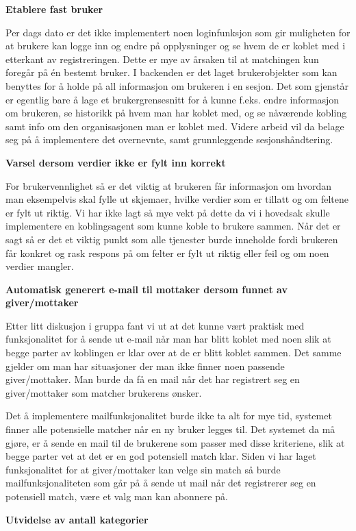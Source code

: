 {\bf Etablere fast bruker}

Per dags dato er det ikke implementert noen loginfunksjon som gir muligheten for at brukere kan logge inn og endre på opplysninger og se hvem de er koblet med i etterkant av registreringen. Dette er mye av årsaken til at matchingen kun foregår på én bestemt bruker. I backenden er det laget brukerobjekter som kan benyttes for å holde på all informasjon om brukeren i en sesjon. Det som gjenstår er egentlig bare å lage et brukergrensesnitt for å kunne f.eks. endre informasjon om brukeren, se historikk på hvem man har koblet med, og se nåværende kobling samt info om den organisasjonen man er koblet med. Videre arbeid vil da belage seg på å implementere det overnevnte, samt grunnleggende sesjonshåndtering.

{\bf Varsel dersom verdier ikke er fylt inn korrekt}

For brukervennlighet så er det viktig at brukeren får informasjon om hvordan man eksempelvis skal fylle ut skjemaer, hvilke verdier som er tillatt og om feltene er fylt ut riktig. Vi har ikke lagt så mye vekt på dette da vi i hovedsak skulle implementere en koblingsagent som kunne koble to brukere sammen. Når det er sagt så er det et viktig punkt som alle tjenester burde inneholde fordi brukeren får konkret og rask respons på om felter er fylt ut riktig eller feil og om noen verdier mangler.

{\bf Automatisk generert e-mail til mottaker dersom funnet av giver/mottaker}

Etter litt diskusjon i gruppa fant vi ut at det kunne vært praktisk med funksjonalitet for å sende ut e-mail når man har blitt koblet med noen slik at begge parter av koblingen er klar over  at de er blitt koblet sammen. Det samme gjelder om man har situasjoner der man ikke finner noen passende giver/mottaker. Man burde da få en mail når det har registrert seg en giver/mottaker som matcher brukerens ønsker.

Det å implementere mailfunksjonalitet burde ikke ta alt for mye tid, systemet finner alle potensielle matcher når en ny bruker legges til. Det systemet da må gjøre, er å sende en mail til de brukerene som passer med disse kriteriene, slik at begge parter vet at det er en god potensiell match klar. Siden vi har laget funksjonalitet for at giver/mottaker kan velge sin match så burde mailfunksjonaliteten som går på å sende ut mail når det registrerer seg en potensiell match, være et valg man kan abonnere på.

{\bf Utvidelse av antall kategorier}

